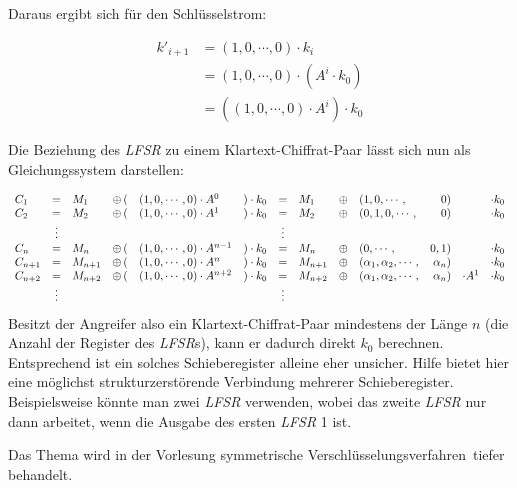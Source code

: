 Daraus ergibt sich für den Schlüsselstrom:

\begin{align*}
k'_{i+1}  & =  (1,0,\cdots,0) \cdot k_i \\ & = (1,0,\cdots,0) \cdot (A^i \cdot k_0) \\ & = ((1,0,\cdots,0) \cdot A^i) \cdot k_0
\end{align*}

Die Beziehung des \emph{LFSR} zu einem Klartext-Chiffrat-Paar lässt sich nun als Gleichungssystem darstellen:


\begin{equation*}
	\begin{array}{lcllllclllrlll}
	C_1 &=& M_1 & \oplus \, ( & (1,0,\cdots,0) \cdot A^0 &)\cdot k_0 & = & M_1 & \oplus &(1,0,\cdots, & 0) &&\cdot k_0\\
	C_2 &=& M_2 & \oplus \, ( & (1,0,\cdots,0) \cdot A^1 &)\cdot k_0 & = & M_2 & \oplus &(0,1,0,\cdots, & 0) &&\cdot k_0\\
	&\vdots &&&&&\vdots &&&&&&\\
	C_{n} &=& M_{n} & \oplus \, ( & (1,0,\cdots,0) \cdot A^{n - 1} &) \cdot k_0 & = & M_{n} & \oplus & (0,\cdots, &0, 1) && \cdot k_0 \\
	C_{n+1} & = & M_{n+1} & \oplus \, ( & (1,0,\cdots,0) \cdot A^n & )\cdot k_0 & = & M_{n+1} & \oplus & (\alpha_1,\alpha_2,\cdots, & \alpha_n) && \cdot k_0 \\
	C_{n + 2} & = & M_{n + 2} & \oplus \, ( & (1,0,\cdots,0) \cdot A^{n + 2} & ) \cdot k_0 & = & M_{n + 2} & \oplus & (\alpha_1,\alpha_2,\cdots, &\alpha_n) &\cdot A^1 & \cdot k_0 \\
	&\vdots &&&&&\vdots &&&&\\
	\end{array}
\end{equation*}
Besitzt der Angreifer also ein Klartext-Chiffrat-Paar mindestens der Länge $n$ (die Anzahl der Register des \emph{LFSR}s), kann er dadurch direkt $k_0$
berechnen. Entsprechend ist ein solches Schieberegister alleine eher unsicher. Hilfe bietet hier eine möglichst strukturzerstörende Verbindung mehrerer
Schieberegister. Beispielsweise könnte man zwei \emph{LFSR} verwenden, wobei das zweite \emph{LFSR} nur dann arbeitet, wenn die Ausgabe des ersten \emph{LFSR}
1 ist.

Das Thema wird in der Vorlesung \glqq symmetrische Verschlüsselungsverfahren\grqq\ tiefer behandelt.

